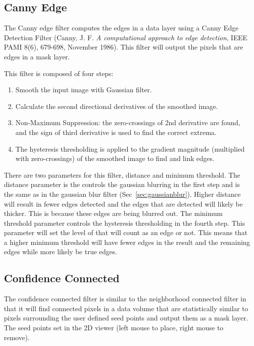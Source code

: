 \documentclass[fleqn,11pt,openany]{book}
\begin{document}
\subsection{Canny Edge}


The Canny edge filter computes the edges in a data layer using a Canny Edge Detection Filter (Canny, J. F. \emph{A computational approach to edge detection}, IEEE PAMI 8(6), 679-698, November 1986).  This filter will output the pixels that are edges in a mask layer.  

This filter is composed of four steps:
\begin{enumerate}
\item Smooth the input image with Gaussian filter.
\item Calculate the second directional derivatives of the smoothed image.
\item Non-Maximum Suppression: the zero-crossings of 2nd derivative are found, and the sign of third derivative is used to find the correct extrema.
\item The hysteresis thresholding is applied to the gradient magnitude (multiplied with zero-crossings) of the smoothed image to find and link edges.
\end{enumerate}

There are two parameters for this filter, distance and minimum threshold.  The distance parameter is the controls the gaussian blurring in the first step and is the same as in the gaussian blur filter (Sec~\ref{sec:gaussianblur}).  Higher distance will result in fewer edges detected and the edges that are detected will likely be thicker.  This is because these edges are being blurred out.  The minimum threshold parameter controls the hysteresis thresholding in the fourth step.  This parameter will set the level of that will count as an edge or not.  This means that a higher minimum threshold will have fewer edges in the result and the remaining edges while more likely be true edges.  

\subsection{Confidence Connected}

The confidence connected filter is similar to the neighborhood connected filter in that it will find connected pixels in a data volume that are statistically similar to pixels surrounding the user defined seed points and output them as a mask layer.  The seed points set in the 2D viewer (left mouse to place, right mouse to remove). 
\end{document}
